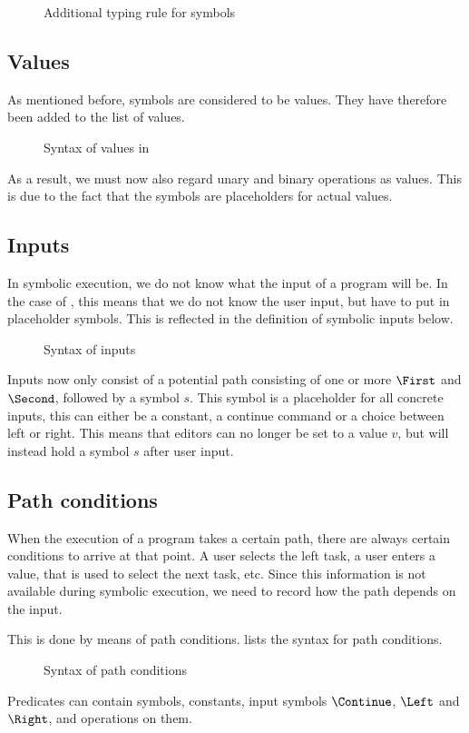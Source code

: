 \begin{figure}
\caption{Additional typing rule for symbols}
  \label{fig:typingsymbol}
\end{figure}

\subsection{Values}

As mentioned before, symbols are considered to be values.
They have therefore been added to the list of values.

\begin{figure}
\caption{Syntax of values in \TOPHAT}
  \label{fig:syntaxvalues}
\end{figure}

As a result, we must now also regard unary and binary operations as values.
This is due to the fact that the symbols are placeholders for actual values.


\subsection{Inputs}

In symbolic execution, we do not know what the input of a program will be.
In the case of \TOPHAT, this means that we do not know the user input, but have to put in placeholder symbols.
This is reflected in the definition of symbolic inputs below.

\begin{figure}
\caption{Syntax of inputs}
  \label{fig:syntaxinputs}
\end{figure}

Inputs now only consist of a potential path consisting of one or more $\First$ and $\Second$,
followed by a symbol $s$.
This symbol is a placeholder for all concrete inputs, this can either be a constant, a continue command or a choice between left or right.
This means that editors can no longer be set to a value $v$, but will instead hold a symbol $s$ after user input.


\subsection{Path conditions}

When the execution of a \TOPHAT program takes a certain path, there are always certain conditions to arrive at that point.
A user selects the left task, a user enters a value, that is used to select the next task, etc.
Since this information is not available during symbolic execution, we need to record how the path depends on the input.

This is done by means of path conditions.
 lists the syntax for path conditions.

\begin{figure}
\caption{Syntax of path conditions}
  \label{fig:syntaxpredicates}
\end{figure}

Predicates can contain symbols, constants, input symbols $\Continue$, $\Left$ and $\Right$, and operations on them.
